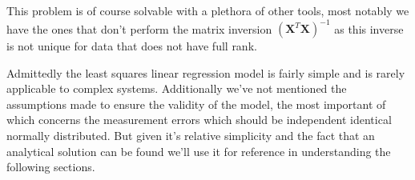  \noindent This problem is of course solvable with a plethora of other tools, most notably we have the ones that don't perform the matrix inversion $(\mathbf{X}^T \mathbf{X})^{-1}$ as this inverse is not unique for data that does not have full rank.

Admittedly the least squares linear regression model is fairly simple and is rarely applicable to complex systems. Additionally we've not mentioned the assumptions made to ensure the validity of the model, the most important of which concerns the measurement errors which should be independent identical normally distributed. But given it's relative simplicity and the fact that an analytical solution can be found we'll use it for reference in understanding the following sections.




